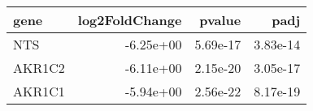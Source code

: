 \begin{tabular}{lrrr}
\toprule
  gene &  log2FoldChange &   pvalue &     padj \\
\midrule
   NTS &       -6.25e+00 & 5.69e-17 & 3.83e-14 \\
AKR1C2 &       -6.11e+00 & 2.15e-20 & 3.05e-17 \\
AKR1C1 &       -5.94e+00 & 2.56e-22 & 8.17e-19 \\
\bottomrule
\end{tabular}
